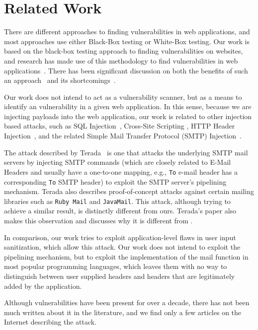 \section{Related Work}

There are different approaches to finding vulnerabilities in web applications, and most approaches use either Black-Box testing or White-Box testing.
Our work is based on the black-box testing approach to finding vulnerabilities on websites, and research has made use of this methodology to find vulnerabilities in web applications~\cite{Beizer:1995:BTT:202699,Huang,kals2006secubat,payet13:ears-in-the-wild,zanero2005automatic}. There has been significant discussion on both the benefits of such an approach~\cite{black-box} and its shortcomings~\cite{Doupe2012,Doupe2010}.

Our work does not intend to act as a vulnerability scanner, but as a means to identify an \ehi vulnerability in a given web application. In this sense, because we are injecting payloads into the web application, our work is related to other injection based attacks, such as SQL Injection~\cite{sql1,sql0,sql2}, Cross-Site Scripting \cite{Injection1,KleinAmit}, HTTP Header Injection~\cite{sessionride}, and the related Simple Mail Transfer Protocol (SMTP) Injection~\cite{Terada2015}.

The attack described by Terada~\cite{Terada2015} is one that attacks the underlying SMTP mail servers by injecting SMTP commands (which are closely related to E-Mail Headers and usually have a one-to-one mapping, e.g., \texttt{To} e-mail header has a corresponding \texttt{To} SMTP header) to exploit the SMTP server's pipelining mechanism. Terada also describes proof-of-concept attacks against certain mailing libraries such as \texttt{Ruby Mail} and \texttt{JavaMail}. This attack, although trying to achieve a similar result, is distinctly different from ours. Terada's paper also makes this observation and discusses why it is different from \ehi.

In comparison, our work tries to exploit application-level flaws in user input sanitization, which allow this attack. Our work does not intend to exploit the pipelining mechanism, but to exploit the implementation of the mail function in most popular programming languages, which leaves them with no way to distinguish between user supplied headers and headers that are legitimately added by the application.

Although \ehi vulnerabilities have been present for over a decade, there has not been much written about it in the literature, and we find only a few articles on the Internet describing the attack.

